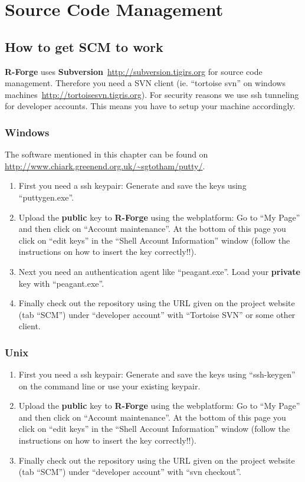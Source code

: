 \documentclass[a4paper]{article}
\begin{document}
\section{Source Code Management}
\label{sec:scm}

\subsection{How to get SCM to work}
\label{sec:scmhowto}

\textbf{R-Forge} uses
\textbf{Subversion}~\url{http://subversion.tigirs.org} for source code
management. Therefore you need a SVN client (ie. ``tortoise svn'' on
windows machines~\url{http://tortoisesvn.tigris.org}). For security
reasons we use ssh tunneling for
developer accounts. This means you have to setup your machine
accordingly.

\subsubsection{Windows}

The software mentioned in this chapter can be found
on \url{http://www.chiark.greenend.org.uk/~sgtotham/putty/}.
\begin{enumerate}
\item First you need a ssh keypair: Generate and save the keys
  using ``puttygen.exe''.  
\item Upload the \textbf{public} key to \textbf{R-Forge} using the webplatform: Go to
  ``My Page'' and then click on ``Account maintenance''. At the bottom
  of this page you click on ``edit keys'' in the ``Shell Account
  Information'' window (follow the instructions on how to insert the
  key correctly!!).
\item Next you need an authentication agent like ``peagant.exe''. Load
  your \textbf{private} key with ``peagant.exe''.
\item Finally check out the repository using the URL given on the
  project website (tab ``SCM'') under ``developer account'' with
  ``Tortoise SVN'' or some other client.
\end{enumerate}

\subsubsection{Unix}

\begin{enumerate}
\item First you need a ssh keypair: Generate and save the keys
  using ``ssh-keygen'' on the command line or use your existing keypair.  
\item Upload the \textbf{public} key to \textbf{R-Forge} using the
  webplatform: Go to
  ``My Page'' and then click on ``Account maintenance''. At the bottom
  of this page you click on ``edit keys'' in the ``Shell Account
  Information'' window (follow the instructions on how to insert the
  key correctly!!).
\item Finally check out the repository using the URL given on the
  project website (tab ``SCM'') under ``developer account'' with
  ``svn checkout''.
\end{enumerate}



\end{document}

